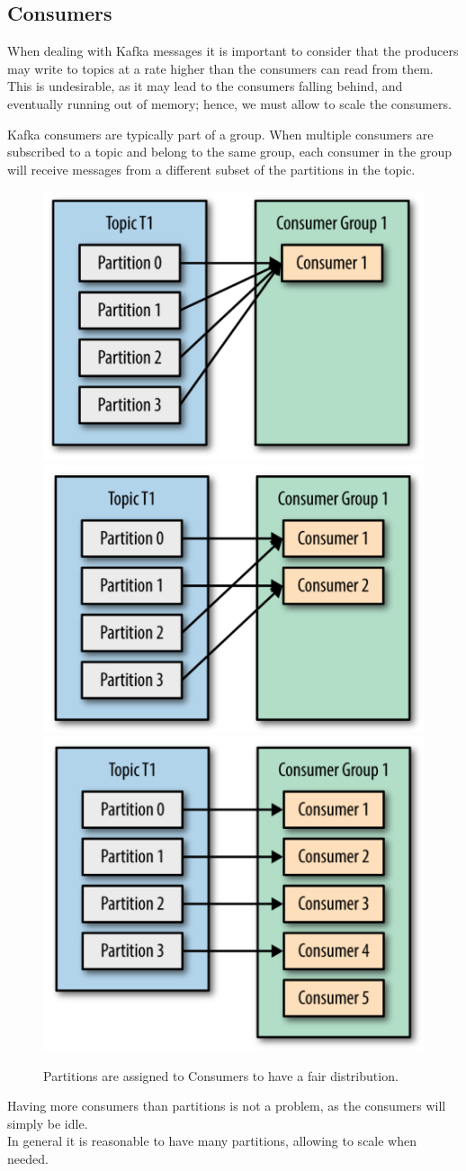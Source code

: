 \subsection{Consumers}

When dealing with Kafka messages it is important to consider that the producers may write to topics at a rate higher than the consumers can read from them.\\
This is undesirable, as it may lead to the consumers falling behind, and eventually running out of memory;
hence, we must allow to scale the consumers.

Kafka consumers are typically part of a group. When multiple consumers are subscribed to a topic and belong to the same group, each consumer in the group will receive messages from a different subset of the partitions in the topic.

\begin{figure}[htbp]
	\centering
	\includegraphics[width=0.3\columnwidth]{images/16/partitions_1.png}
	\includegraphics[width=0.3\columnwidth]{images/16/partitions_2.png}
	\includegraphics[width=0.3\columnwidth]{images/16/partitions_3.png}
	\caption{Partitions are assigned to Consumers to have a fair distribution.}
	\label{fig:16/partitions_1}
\end{figure}

Having more consumers than partitions is not a problem, as the consumers will simply be idle.\\
In general it is reasonable to have many partitions, allowing to scale when needed.

